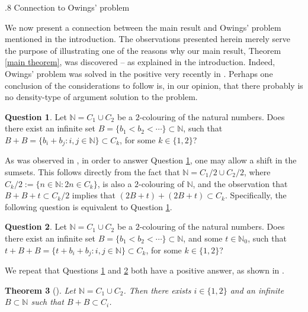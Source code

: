 \documentclass[reqno]{amsart}
\makeatletter
\def\N{{\mathbb N}}
\newtheorem{theorem}{Theorem}[section]
\theoremstyle{definition}
\newtheorem{question}[theorem]{Question}
\theoremstyle{remark}
\def\section{\@startsection{section}{1}%
  \z@{.5\linespacing\@plus.7\linespacing}
{.8\baselineskip}%
  {\normalfont\fontsize{11}{13}\centering\bfseries}%
}
\theoremstyle{remark}
\def\N{{\mathbb N}}
\makeatother
\begin{document}
\appendix 

\section{Connection to Owings' problem}\label{Owing}

We now present a connection between the main result and 
Owings' problem mentioned in the introduction. The 
observations presented herein merely serve the purpose of 
illustrating one of the reasons why our main result, Theorem \ref{main theorem}, was discovered -- as explained in the introduction. Indeed, Owings' problem was solved in the positive very recently in \cite{owings_solution}. Perhaps one conclusion of the considerations to follow is, in our opinion, that there probably is no density-type of argument solution to the problem. 

\begin{question}\label{B+B}
Let $\N=C_1 \cup C_2$ be a $2$-colouring of 
the natural numbers. Does there exist an infinite set $B=\{b_1<b_2< \cdots \}\subset \N$, such that $B+B=\{b_i+b_j: i,j\in \N\} \subset C_{k}$, for some $k\in \{1,2\}$?
\end{question}

As was observed in \cite[Remark 6.2]{kousek_radic2025BB}, in 
order to answer Question \ref{B+B}, one may allow a shift in 
the sumsets. This follows directly from the fact that $\N=C_1/2 \cup C_2/2$, where $C_k/2:=\{n\in \N: 2n\in C_k\}$, is also a $2$-colouring of $\N$, and the observation that $B+B+t \subset C_k/2$ implies that $(2B+t)+(2B+t) \subset C_k.$ Specifically, the following question is 
equivalent to Question \ref{B+B}.

\begin{question}\label{B+B shift}
Let $\N=C_1 \cup C_2$ be a $2$-colouring of 
the natural numbers. Does there exist an infinite set $B=\{b_1<b_2< \cdots \}\subset \N$, and some $t\in \N_0$, such that $t+B+B=\{t+b_i+b_j: i,j\in \N\} \subset C_{k}$, for some $k\in \{1,2\}$?
\end{question}

We repeat that Questions \ref{B+B} and \ref{B+B shift} both have a positive answer, as shown in \cite{owings_solution}.  

\begin{theorem}[{\cite[Theorem 1.1]{owings_solution}}]  \label{owings_solution_theorem}
Let $\N=C_1\cup C_2$. Then there exists $i\in \{1,2\}$ and an infinite $B\subset \N$ such that $B+B\subset C_i$.   
\end{theorem}
\end{document}
